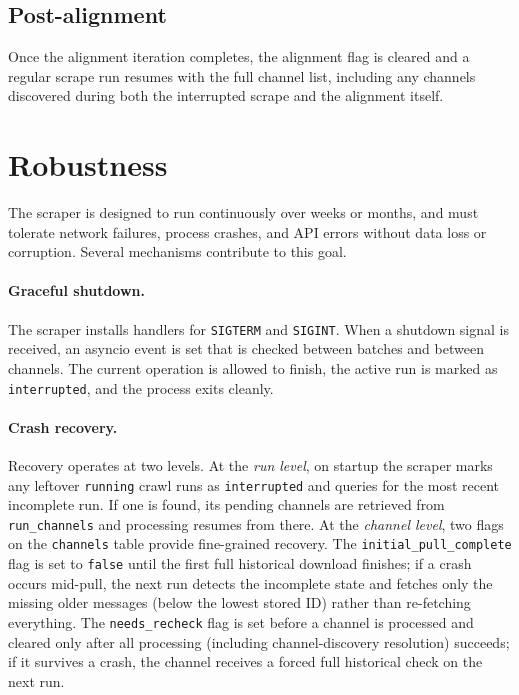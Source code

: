 \subsection{Post-alignment}

Once the alignment iteration completes, the alignment flag is cleared and a regular scrape run resumes with the full channel list, including any channels discovered during both the interrupted scrape and the alignment itself.

\section{Robustness}
\label{sec:robustness}

The scraper is designed to run continuously over weeks or months, and must tolerate network failures, process crashes, and API errors without data loss or corruption.
Several mechanisms contribute to this goal.

\paragraph{Graceful shutdown.}
The scraper installs handlers for \texttt{SIGTERM} and \texttt{SIGINT}.
When a shutdown signal is received, an asyncio event is set that is checked between batches and between channels.
The current operation is allowed to finish, the active run is marked as \texttt{interrupted}, and the process exits cleanly.

\paragraph{Crash recovery.}
Recovery operates at two levels.
At the \emph{run level}, on startup the scraper marks any leftover \texttt{running} crawl runs as \texttt{interrupted} and queries for the most recent incomplete run.
If one is found, its pending channels are retrieved from \texttt{run\_channels} and processing resumes from there.
At the \emph{channel level}, two flags on the \texttt{channels} table provide fine-grained recovery.
The \texttt{initial\_pull\_complete} flag is set to \texttt{false} until the first full historical download finishes; if a crash occurs mid-pull, the next run detects the incomplete state and fetches only the missing older messages (below the lowest stored ID) rather than re-fetching everything.
The \texttt{needs\_recheck} flag is set before a channel is processed and cleared only after all processing (including channel-discovery resolution) succeeds; if it survives a crash, the channel receives a forced full historical check on the next run.

